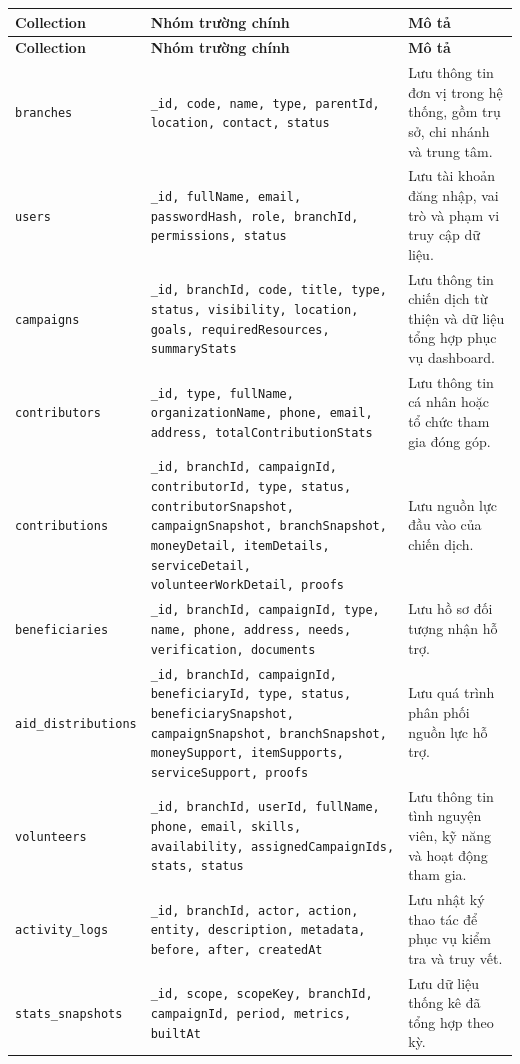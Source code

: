 \documentclass[12pt,a4paper]{article}
\begin{document}
\begin{center}
\small
\begin{longtable}{|p{3.3cm}|p{4.2cm}|p{5cm}|}
\hline
\textbf{Collection} & \textbf{Nhóm trường chính} & \textbf{Mô tả} \\ \hline
\endfirsthead
\hline
\textbf{Collection} & \textbf{Nhóm trường chính} & \textbf{Mô tả} \\ \hline
\endhead
\texttt{branches} & \texttt{\_id, code, name, type, parentId, location, contact, status} & Lưu thông tin đơn vị trong hệ thống, gồm trụ sở, chi nhánh và trung tâm. \\ \hline
\texttt{users} & \texttt{\_id, fullName, email, passwordHash, role, branchId, permissions, status} & Lưu tài khoản đăng nhập, vai trò và phạm vi truy cập dữ liệu. \\ \hline
\texttt{campaigns} & \texttt{\_id, branchId, code, title, type, status, visibility, location, goals, requiredResources, summaryStats} & Lưu thông tin chiến dịch từ thiện và dữ liệu tổng hợp phục vụ dashboard. \\ \hline
\texttt{contributors} & \texttt{\_id, type, fullName, organizationName, phone, email, address, totalContributionStats} & Lưu thông tin cá nhân hoặc tổ chức tham gia đóng góp. \\ \hline
\texttt{contributions} & \texttt{\_id, branchId, campaignId, contributorId, type, status, contributorSnapshot, campaignSnapshot, branchSnapshot, moneyDetail, itemDetails, serviceDetail, volunteerWorkDetail, proofs} & Lưu nguồn lực đầu vào của chiến dịch. \\ \hline
\texttt{beneficiaries} & \texttt{\_id, branchId, campaignId, type, name, phone, address, needs, verification, documents} & Lưu hồ sơ đối tượng nhận hỗ trợ. \\ \hline
\texttt{aid\_distributions} & \texttt{\_id, branchId, campaignId, beneficiaryId, type, status, beneficiarySnapshot, campaignSnapshot, branchSnapshot, moneySupport, itemSupports, serviceSupport, proofs} & Lưu quá trình phân phối nguồn lực hỗ trợ. \\ \hline
\texttt{volunteers} & \texttt{\_id, branchId, userId, fullName, phone, email, skills, availability, assignedCampaignIds, stats, status} & Lưu thông tin tình nguyện viên, kỹ năng và hoạt động tham gia. \\ \hline
\texttt{activity\_logs} & \texttt{\_id, branchId, actor, action, entity, description, metadata, before, after, createdAt} & Lưu nhật ký thao tác để phục vụ kiểm tra và truy vết. \\ \hline
\texttt{stats\_snapshots} & \texttt{\_id, scope, scopeKey, branchId, campaignId, period, metrics, builtAt} & Lưu dữ liệu thống kê đã tổng hợp theo kỳ. \\ \hline
\end{longtable}
\normalsize
\end{center}
\end{document}
